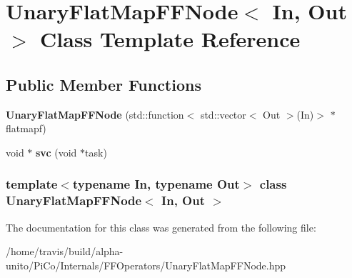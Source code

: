 \hypertarget{class_unary_flat_map_f_f_node}{\section{\-Unary\-Flat\-Map\-F\-F\-Node$<$ \-In, \-Out $>$ \-Class \-Template \-Reference}
\label{class_unary_flat_map_f_f_node}
}
\subsection*{\-Public \-Member \-Functions}
\begin{DoxyCompactItemize}
\item 
\hypertarget{class_unary_flat_map_f_f_node_a1b7fa7a777e1865b1c8c4ecf3a6839cc}{{\bfseries \-Unary\-Flat\-Map\-F\-F\-Node} (std\-::function$<$ std\-::vector$<$ \-Out $>$(\-In)$>$ $\ast$flatmapf)}\label{class_unary_flat_map_f_f_node_a1b7fa7a777e1865b1c8c4ecf3a6839cc}

\item 
\hypertarget{class_unary_flat_map_f_f_node_abe8d9f971dd708546ce60daf0fcd3b3f}{void $\ast$ {\bfseries svc} (void $\ast$task)}\label{class_unary_flat_map_f_f_node_abe8d9f971dd708546ce60daf0fcd3b3f}

\end{DoxyCompactItemize}
\subsubsection*{template$<$typename In, typename Out$>$ class Unary\-Flat\-Map\-F\-F\-Node$<$ In, Out $>$}



\-The documentation for this class was generated from the following file\-:\begin{DoxyCompactItemize}
\item 
/home/travis/build/alpha-\/unito/\-Pi\-Co/\-Internals/\-F\-F\-Operators/\-Unary\-Flat\-Map\-F\-F\-Node.\-hpp\end{DoxyCompactItemize}
